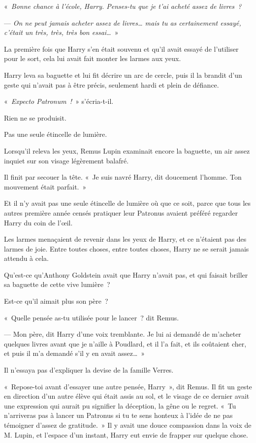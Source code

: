 «~\emph{Bonne chance à l'école, Harry.
Penses-tu que je t'ai acheté assez de livres~?}

--- \emph{On ne peut jamais acheter assez de livres… mais tu as certainement essayé, c'était un très, très, très bon essai…}~»

La première fois que Harry s'en était souvenu et qu'il avait essayé de l'utiliser pour le sort, cela lui avait fait monter les larmes aux yeux.

Harry leva sa baguette et lui fit décrire un arc de cercle, puis il la brandit d'un geste qui n'avait pas à être précis, seulement hardi et plein de défiance.

«~\emph{Expecto Patronum~!}~» s'écria-t-il.

Rien ne se produisit.

Pas une seule étincelle de lumière.

Lorsqu'il releva les yeux, Remus Lupin examinait encore la baguette, un air assez inquiet sur son visage légèrement balafré.

Il finit par secouer la tête.
«~Je suis navré Harry, dit doucement l'homme.
Ton mouvement était parfait.~»

Et il n'y avait pas une seule étincelle de lumière où que ce soit, parce que tous les autres première année censés pratiquer leur Patronus avaient préféré regarder Harry du coin de l'œil.

Les larmes menaçaient de revenir dans les yeux de Harry, et ce n'étaient pas des larmes de joie.
Entre toutes choses, entre toutes choses, Harry ne se serait jamais attendu à cela.

Qu'est-ce qu'Anthony Goldstein avait que Harry n'avait pas, et qui faisait briller sa baguette de cette vive lumière~?

Est-ce qu'il aimait plus son père~?

«~Quelle pensée as-tu utilisée pour le lancer~? dit Remus.

--- Mon père, dit Harry d'une voix tremblante.
Je lui ai demandé de m'acheter quelques livres avant que je n'aille à Poudlard, et il l'a fait, et ils coûtaient cher, et puis il m'a demandé s'il y en avait assez…~»

Il n'essaya pas d'expliquer la devise de la famille Verres.

«~Repose-toi avant d'essayer une autre pensée, Harry~», dit Remus.
Il fit un geste en direction d'un autre élève qui était assis au sol, et le visage de ce dernier avait une expression qui aurait pu signifier la déception, la gêne ou le regret.
«~Tu n'arriveras pas à lancer un Patronus si tu te sens honteux à l'idée de ne pas témoigner d'assez de gratitude.~»
Il y avait une douce compassion dans la voix de M. Lupin, et l'espace d'un instant, Harry eut envie de frapper sur quelque chose.

